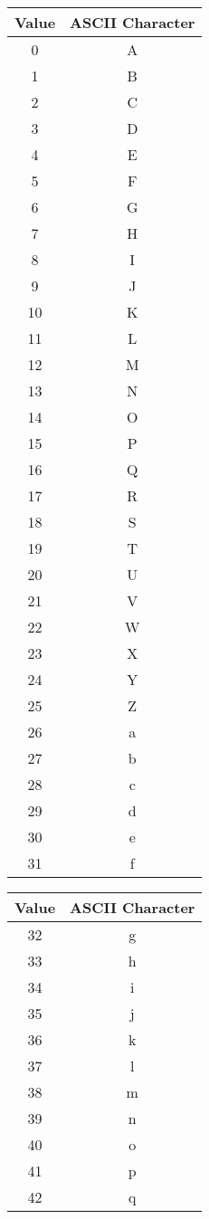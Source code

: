 {\scriptsize\ttfamily\begin{tabular}{c c}
  \hline
  Value & ASCII Character \\
  \hline
   0 & A \\
   1 & B \\
   2 & C \\
   3 & D \\
   4 & E \\
   5 & F \\
   6 & G \\
   7 & H \\
   8 & I \\
   9 & J \\
  10 & K \\
  11 & L \\
  12 & M \\
  13 & N \\
  14 & O \\
  15 & P \\
  16 & Q \\
  17 & R \\
  18 & S \\
  19 & T \\
  20 & U \\
  21 & V \\
  22 & W \\
  23 & X \\
  24 & Y \\
  25 & Z \\
  26 & a \\
  27 & b \\
  28 & c \\
  29 & d \\
  30 & e \\
  31 & f \\
\end{tabular}
\begin{tabular}{c c}
  \hline
  Value & ASCII Character \\
  \hline
  32 & g \\
  33 & h \\
  34 & i \\
  35 & j \\
  36 & k \\
  37 & l \\
  38 & m \\
  39 & n \\
  40 & o \\
  41 & p \\
  42 & q \\

\end{tabular}}
